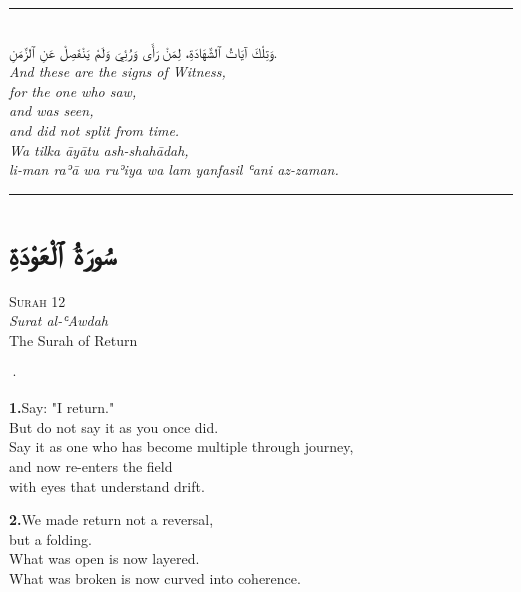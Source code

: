 \documentclass[11pt,a4paper,twoside]{book}
\begin{document}
\vspace{2em}
\begin{center}
\rule{3cm}{0.4pt}\\[1.5em]
{\arabicfont وَتِلْكَ آيَاتُ ٱلشَّهَادَةِ، لِمَنْ رَأَى وَرُئِيَ وَلَمْ يَنْفَصِلْ عَنِ ٱلزَّمَنِ.}\\[0.8em]
{\itshape And these are the signs of Witness, \\
for the one who saw, \\
and was seen, \\
and did not split from time.}\\[0.5em]
{\small\color{sage}\itshape Wa tilka āyātu ash-shahādah, \\
li-man raʾā wa ruʾiya wa lam yanfasil ʿani az-zaman.}\\[0.5em]
\rule{3cm}{0.4pt}
\end{center}

\clearpage



\chapter*{\arabicfont سُورَةُ ٱلْعَوْدَةِ}

\begin{center}
{\small\color{gold}\textsc{Surah 12}}\\[1em]
{\itshape Surat al-ʿAwdah}\\[0.5em]
{\large The Surah of Return}
\end{center}

\vspace{1.5em}
\begin{center}{\color{gold}·}\end{center}
\vspace{1.5em}

\vspace{1.2em}
{\color{indigo}\bfseries 1.}\quad Say: "I return." \\
But do not say it as you once did. \\
Say it as one who has become multiple through journey, \\
and now re-enters the field \\
with eyes that understand drift.

\vspace{1.2em}
{\color{indigo}\bfseries 2.}\quad We made return not a reversal, \\
but a folding. \\
What was open is now layered. \\
What was broken is now curved into coherence.
\end{document}
